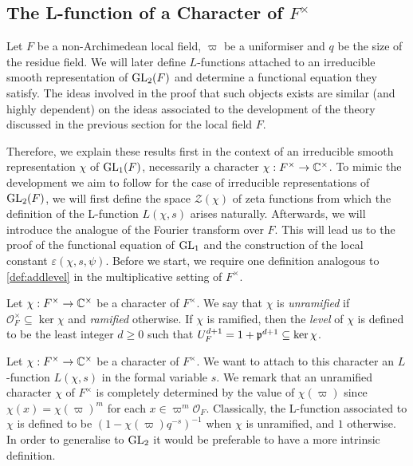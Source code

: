 \subsection{The L-function of a Character of \texorpdfstring{$F^\times$}{TEXT}}

Let $F$ be a non-Archimedean local field, $\varpi$ be a uniformiser and $q$ be the size of the residue field. We will later define $L$-functions attached to an irreducible smooth representation of $\mathrm{GL}_2(F)$ and determine a functional equation they satisfy. The ideas involved in the proof that such objects exists are similar (and highly dependent) on the ideas associated to the development of the theory discussed in the previous section for the local field $F$. 

Therefore, we explain these results first in the context of an irreducible smooth representation $\chi$ of $\mathrm{GL}_1(F)$, necessarily a character $\chi: F^\times \to \mathbb{C}^\times$. To mimic the development we aim to follow for the case of irreducible representations of $\mathrm{GL}_2(F)$, we will first define the space $\mathcal Z(\chi)$ of zeta functions from which the definition of the L-function $L(\chi,s)$ arises naturally. Afterwards, we will introduce the analogue of the Fourier transform over $F$. This will lead us to the proof of the functional equation of $\mathrm{GL}_1$ and the construction of the local constant $\varepsilon(\chi,s,\psi)$. Before we start, we require one definition analogous to \ref{def:addlevel} in the multiplicative setting of $F^\times$.

\begin{defn}
    Let $\chi:F^\times\to\mathbb{C}^\times$ be a character of $F^\times$. We say that $\chi$ is \textit{unramified} if $\mathcal{O}_F^\times\subseteq\ker\chi$ and \textit{ramified} otherwise. If $\chi$ is ramified, then the \textit{level} of $\chi$ is defined to be the least integer $d\geq0$ such that $U_F^{d+1}=1+\mathfrak{p}^{d+1}\subseteq\ker\chi$.
\end{defn}

Let $\chi: F^\times \to \mathbb{C}^\times$ be a character of $F^\times$. We want to attach to this character an $L$-function $L(\chi,s)$ in the formal variable $s$. We remark that an unramified character $\chi$ of $F^\times$ is completely determined by the value of $\chi(\varpi)$ since $\chi(x)=\chi(\varpi)^m$ for each $x\in\varpi^m\mathcal{O}_F$. Classically, the L-function associated to $\chi$ is defined to be $(1-\chi(\varpi)q^{-s})^{-1}$ when $\chi$ is unramified, and $1$ otherwise. In order to generalise to $\mathrm{GL}_2$ it would be preferable to have a more intrinsic definition.

